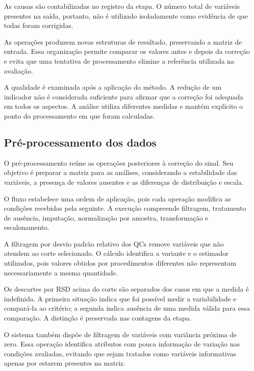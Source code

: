 As causas são contabilizadas no registro da etapa. O número total de variáveis presentes na saída, portanto, não é utilizado isoladamente como evidência de que todas foram corrigidas.

As operações produzem novas estruturas de resultado, preservando a matriz de entrada. Essa organização permite comparar os valores antes e depois da correção e evita que uma tentativa de processamento elimine a referência utilizada na avaliação.

A qualidade é examinada após a aplicação do método. A redução de um indicador não é considerada suficiente para afirmar que a correção foi adequada em todos os aspectos. A análise utiliza diferentes medidas e mantém explícito o ponto do processamento em que foram calculadas.

\subsection{Pré-processamento dos dados}
\label{subsec:pre-processamento-dados}

O pré-processamento reúne as operações posteriores à correção do sinal. Seu objetivo é preparar a matriz para as análises, considerando a estabilidade das variáveis, a presença de valores ausentes e as diferenças de distribuição e escala.

O fluxo estabelece uma ordem de aplicação, pois cada operação modifica as condições recebidas pela seguinte. A execução compreende filtragem, tratamento de ausência, imputação, normalização por amostra, transformação e escalonamento.

A filtragem por desvio padrão relativo dos QCs remove variáveis que não atendem ao corte selecionado. O cálculo identifica a variante e o estimador utilizados, pois valores obtidos por procedimentos diferentes não representam necessariamente a mesma quantidade.

Os descartes por RSD acima do corte são separados dos casos em que a medida é indefinida. A primeira situação indica que foi possível medir a variabilidade e compará-la ao critério; a segunda indica ausência de uma medida válida para essa comparação. A distinção é preservada nas contagens da etapa.

O sistema também dispõe de filtragem de variáveis com variância próxima de zero. Essa operação identifica atributos com pouca informação de variação nas condições avaliadas, evitando que sejam tratados como variáveis informativas apenas por estarem presentes na matriz.

